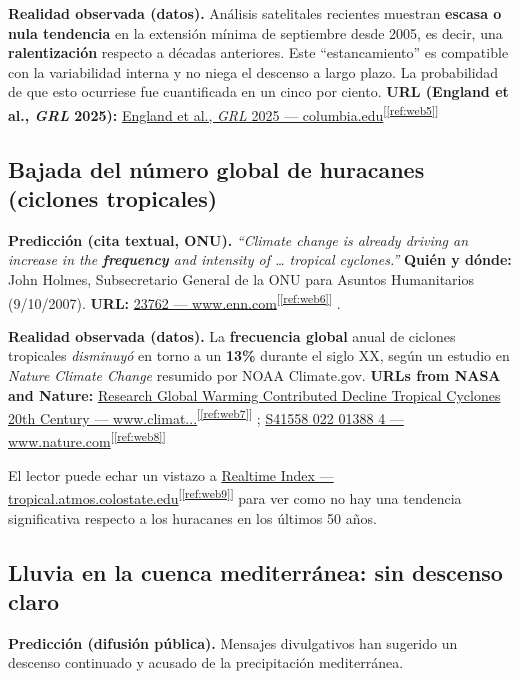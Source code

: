 \documentclass[
  10pt,
  a4paper,
  DIV=11,
  numbers=noendperiod,
  open=any]{scrreprt}
\numberwithin{equation}{chapter}
\numberwithin{equation}{section}
\renewcommand{\[}{\begin{equation}}
\renewcommand{\]}{\end{equation}}
\newcommand{\refweb}[3]{%
  \href{#1}{#2}\textsuperscript{[\ref{ref:#3}]}%
}
\begin{document}
\textbf{Realidad observada (datos).}
Análisis satelitales recientes muestran \textbf{escasa o nula tendencia} en la extensión mínima de septiembre desde 2005, es decir, una \textbf{ralentización} respecto a décadas anteriores. Este “estancamiento” es compatible con la variabilidad interna y no niega el descenso a largo plazo. La probabilidad de que esto ocurriese fue cuantificada en un cinco por ciento. 
\textbf{URL (England et al., \textit{GRL} 2025):}
\refweb{https://www.columbia.edu/\string~lmp/paps/england\%2Betal-GRL-2025.pdf}
{England et al., \textit{GRL} 2025 — columbia.edu}
{web5}
\medskip

\subsection{Bajada del número global de huracanes (ciclones tropicales)}

\textbf{Predicción (cita textual, ONU).}
\emph{“Climate change is already driving an increase in the \textbf{frequency} and intensity of \dots{} tropical cyclones.”}
\textbf{Quién y dónde:} John Holmes, Subsecretario General de la ONU para Asuntos Humanitarios (9/10/2007).
\textbf{URL:} \refweb{https://www.enn.com/articles/23762}{23762 — www.enn.com}{web6}.

\textbf{Realidad observada (datos).}
La \textbf{frecuencia global} anual de ciclones tropicales \emph{disminuyó} en torno a un \textbf{13\%} durante el siglo XX, según un estudio en \textit{Nature Climate Change} resumido por NOAA Climate.gov.
\textbf{URLs from NASA and Nature:} \refweb{https://www.climate.gov/news-features/feed/research-global-warming-contributed-decline-tropical-cyclones-20th-century/}{Research Global Warming Contributed Decline Tropical Cyclones 20th Century — www.climat...}{web7}; \refweb{https://www.nature.com/articles/s41558-022-01388-4}{S41558 022 01388 4 — www.nature.com}{web8}
El lector puede echar un vistazo a \refweb{https://tropical.atmos.colostate.edu/Realtime/index.php?arch\&loc=global}{Realtime Index — tropical.atmos.colostate.edu}{web9} para ver como no hay una tendencia significativa respecto a los huracanes en los últimos 50 años.


\medskip

\subsection{Lluvia en la cuenca mediterránea: sin descenso claro}

\textbf{Predicción (difusión pública).}
Mensajes divulgativos han sugerido un descenso continuado y acusado de la precipitación mediterránea.
\end{document}
